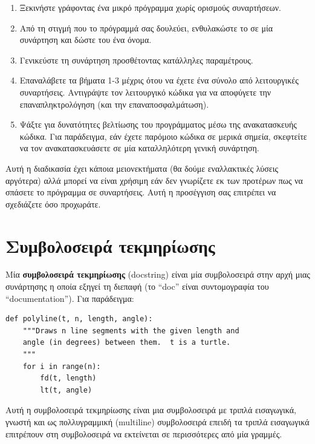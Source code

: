 \documentclass[10pt]{book}
\begin{document}
\begin{enumerate}

\item Ξεκινήστε γράφοντας ένα μικρό πρόγραμμα χωρίς ορισμούς συναρτήσεων.

\item Από τη στιγμή που το πρόγραμμά σας δουλεύει, ενθυλακώστε το σε μία
συνάρτηση και δώστε του ένα όνομα.

\item Γενικεύστε τη συνάρτηση προσθέτοντας κατάλληλες παραμέτρους.

\item Επαναλάβετε τα βήματα 1-3 μέχρις ότου να έχετε ένα σύνολο από λειτουργικές συναρτήσεις. Αντιγράψτε τον λειτουργικό κώδικα για να αποφύγετε την επαναπληκτρολόγηση (και την επαναποσφαλμάτωση).

\item Ψάξτε για δυνατότητες βελτίωσης του προγράμματος μέσω της ανακατασκευής κώδικα. Για παράδειγμα, εάν έχετε παρόμοιο κώδικα σε μερικά σημεία, σκεφτείτε να τον ανακατασκευάσετε σε μία καταλληλότερη γενική συνάρτηση.

\end{enumerate}

Αυτή η διαδικασία έχει κάποια μειονεκτήματα (θα δούμε εναλλακτικές λύσεις αργότερα) αλλά μπορεί να είναι χρήσιμη εάν δεν γνωρίζετε εκ των προτέρων πως να σπάσετε το πρόγραμμα σε συναρτήσεις. Αυτή η προσέγγιση σας επιτρέπει να σχεδιάζετε όσο προχωράτε.


\section{Συμβολοσειρά τεκμηρίωσης}
\label{docstring}

Μία {\bf συμβολοσειρά τεκμηρίωσης} (docstring) είναι μία συμβολοσειρά στην αρχή μιας συνάρτησης η οποία εξηγεί τη διεπαφή (το ``doc'' είναι συντομογραφία του ``documentation''). Για παράδειγμα:


\begin{verbatim}
def polyline(t, n, length, angle):
    """Draws n line segments with the given length and
    angle (in degrees) between them.  t is a turtle.
    """
    for i in range(n):
        fd(t, length)
        lt(t, angle)
\end{verbatim}
%

Αυτή η συμβολοσειρά τεκμηρίωσης είναι μια συμβολοσειρά με τριπλά εισαγωγικά,
γνωστή και ως πολλυγραμμική (multiline) συμβολοσειρά επειδή τα τριπλά εισαγωγικά επιτρέπουν στη συμβολοσειρά να εκτείνεται σε περισσότερες από μία γραμμές.
\end{document}
